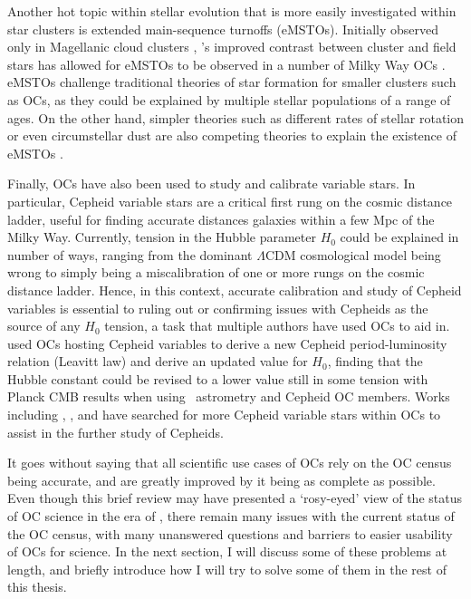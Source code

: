 Another hot topic within stellar evolution that is more easily investigated within star clusters is extended main-sequence turnoffs (eMSTOs). Initially observed only in Magellanic cloud clusters \citep[e.g.][]{bastian_effect_stellar_2009}, \gaia's improved contrast between cluster and field stars has allowed for eMSTOs to be observed in a number of Milky Way OCs \citep{marino_discovery_2018}. eMSTOs challenge traditional theories of star formation for smaller clusters such as OCs, as they could be explained by multiple stellar populations of a range of ages. On the other hand, simpler theories such as different rates of stellar rotation or even circumstellar dust are also competing theories to explain the existence of eMSTOs \citep{milone_multiple_2022,dantona_role_dust_2023}.

Finally, OCs have also been used to study and calibrate variable stars. In particular, Cepheid variable stars are a critical first rung on the cosmic distance ladder, useful for finding accurate distances galaxies within a few Mpc of the Milky Way. Currently, tension in the Hubble parameter $H_0$ could be explained in number of ways, ranging from the dominant $\Lambda$CDM cosmological model being wrong to simply being a miscalibration of one or more rungs on the cosmic distance ladder. Hence, in this context, accurate calibration and study of Cepheid variables is essential to ruling out or confirming issues with Cepheids as the source of any $H_0$ tension, a task that multiple authors have used OCs to aid in. \cite{breuval_milky_way_2020} used OCs hosting Cepheid variables to derive a new Cepheid period-luminosity relation (Leavitt law) and derive an updated value for $H_0$, finding that the Hubble constant could be revised to a lower value still in some tension with Planck CMB results \citep{planckcollaboration_planck_2018_2020} when using \gaia\ astrometry and Cepheid OC members. Works including \cite{medina_revisited_2021}, \cite{zhou_galactic_2021}, and \cite{hao_open_2022} have searched for more Cepheid variable stars within OCs to assist in the further study of Cepheids.

It goes without saying that all scientific use cases of OCs rely on the OC census being accurate, and are greatly improved by it being as complete as possible. Even though this brief review may have presented a `rosy-eyed' view of the status of OC science in the era of \gaia, there remain many issues with the current status of the OC census, with many unanswered questions and barriers to easier usability of OCs for science. In the next section, I will discuss some of these problems at length, and briefly introduce how I will try to solve some of them in the rest of this thesis.



